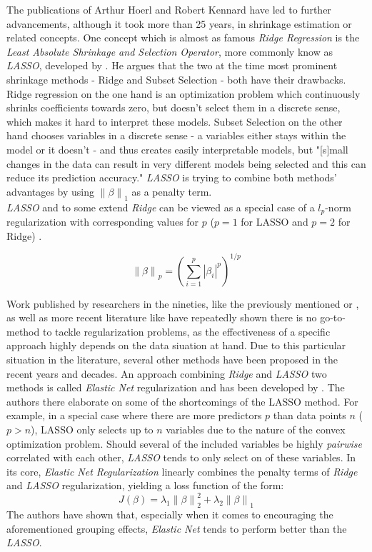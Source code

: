 \documentclass[12pt,a4paper]{article}
\newcommand{\norm}[1]{\left\lVert#1\right\rVert}
\begin{document}
The publications of Arthur Hoerl and Robert Kennard have led to further advancements, although it took more than 25 years, in shrinkage estimation or related concepts. One concept which is almost as famous \textit{Ridge Regression} is the \textit{Least Absolute Shrinkage and Selection Operator}, more commonly know as \textit{LASSO}, developed by \textcite{Tibishirani1996}. He argues that the two at the time most prominent shrinkage methods - Ridge and Subset Selection - both have their drawbacks. Ridge regression on the one hand is an optimization problem which continuously shrinks coefficients towards zero, but doesn't select them in a discrete sense, which makes it hard to interpret these models. Subset Selection on the other hand chooses variables in a discrete sense - a variables either stays within the model or it doesn't - and thus creates easily interpretable models, but "[s]mall changes in the data can result in very different models being selected and this can reduce its prediction accuracy." \parencite{Tibishirani1996} \textit{LASSO} is trying to combine both methods' advantages by using $\norm{\beta}_1$ as a penalty term.\\

\textit{LASSO} and to some extend \textit{Ridge} can be viewed as a special case of a $l_p$-norm regularization with corresponding values for $p$ ($p = 1$ for LASSO and $p=2$ for Ridge) \parencite{FrankFriedman1993}. 

$$\norm{\beta}_p =  \left(\sum_{i=1}^p|\beta_i|^p\right)^{1/p}$$

Work published by researchers in the nineties, like the previously mentioned \textcite{FrankFriedman1993} or \textcite{Fu1998}, as well as more recent literature like \textcite{WangEtAl2020} have repeatedly shown there is no go-to-method to tackle regularization problems, as the effectiveness of a specific approach highly depends on the data siuation at hand. Due to this particular situation in the literature, several other methods have been proposed in the recent years and decades. An approach combining \textit{Ridge} and \textit{LASSO} two methods is called \textit{Elastic Net} regularization and has been developed by \textcite{ZouHastie2005}. The authors there elaborate on some of the shortcomings of the LASSO method. For example, in a special case where there are more predictors $p$ than data points $n$ ($p > n$), LASSO only selects up to $n$ variables due to the nature of the convex optimization problem. Should several of the included variables be highly \textit{pairwise} correlated with each other, \textit{LASSO} tends to only select on of these variables. In its core, \textit{Elastic Net Regularization} linearly combines the penalty terms of \textit{Ridge} and \textit{LASSO} regularization, yielding a loss function of the form:\\
$$J(\beta) = \lambda_1 \norm{\beta}_2^2 + \lambda_2 \norm{\beta}_1$$
The authors have	 shown that, especially when it comes to encouraging the aforementioned grouping effects, \textit{Elastic Net} tends to perform better than the \textit{LASSO}.\\
\end{document}
